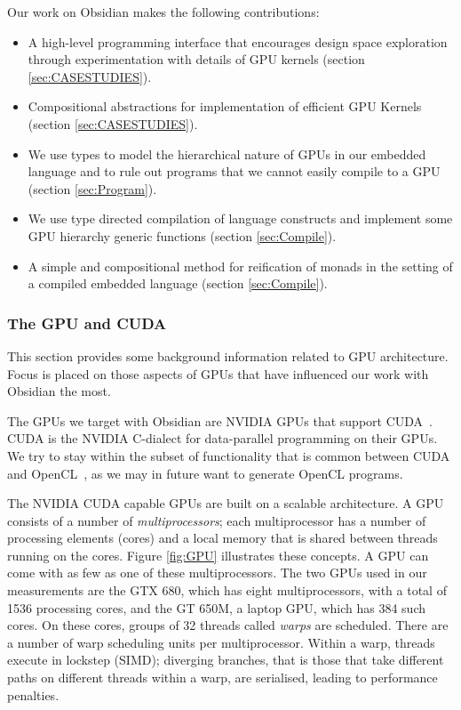 Our work on Obsidian makes the following contributions: 
\begin{itemize} 
  \item A high-level programming interface that encourages design space exploration through experimentation with 
    details of GPU kernels (section \ref{sec:CASESTUDIES}).
  \item Compositional abstractions for implementation of efficient GPU 
    Kernels (section \ref{sec:CASESTUDIES}).
  \item We use types to model the hierarchical nature of GPUs in our embedded 
    language and to rule out programs that we cannot easily compile to a GPU (section \ref{sec:Program}).
  \item We use type directed compilation of language constructs and 
    implement some GPU hierarchy generic functions (section \ref{sec:Compile}).
  \item A simple and compositional method for reification of monads in the 
    setting of a compiled embedded language (section \ref{sec:Compile}).
  
\end{itemize} 


\subsubsection{The GPU and CUDA}
\label{sec:GPU}

This section provides some background information related to GPU architecture. 
Focus is placed on those aspects of GPUs that have influenced our work with 
Obsidian the most. 

The GPUs we target with Obsidian are NVIDIA GPUs that support CUDA~\cite{CUDA}.
CUDA is the NVIDIA C-dialect for data-parallel programming on their GPUs. 
We try to stay within the subset of functionality that is common 
between CUDA and OpenCL~\cite{OpenCL}, as we may in future want to generate 
OpenCL programs. 

The NVIDIA CUDA capable GPUs are built on a scalable architecture. A GPU 
consists of a number of {\em multiprocessors}; each multiprocessor has a 
number of processing elements (cores) and a local memory that is shared 
between threads running on the cores. Figure \ref{fig:GPU} illustrates these 
concepts. A GPU can come with as few as one of these multiprocessors.
The two GPUs used in our measurements are the GTX 680, which has eight multiprocessors, with a total of 1536 processing cores, and the GT 650M, a laptop GPU, which has 384 such cores.
On these cores, groups of 32 threads called {\em warps} are scheduled. There are a number 
of warp scheduling units per multiprocessor. Within a warp, threads execute in 
lockstep (SIMD); diverging branches, that is those that take different 
paths on different threads within a warp, are serialised, 
leading to performance penalties. 


